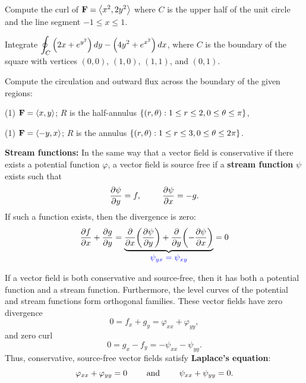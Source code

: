 \documentclass[mathNotesPreamble]{subfiles}
\begin{document}
  \begin{ex*}
    Compute the curl of $\mathbf F={\left\langle x^2,2y^2 \right\rangle}$ where $C$ is the upper half of the unit circle and the line segment $-1\leq x\leq 1$.
  \end{ex*}
  \pagebreak

  \begin{ex*}
    Integrate $\displaystyle \oint_C {\left(2x+e^{y^2}\right)}\,dy-{\left(4y^2+e^{x^2}\right)}\,dx$, where $C$ is the boundary of the square with vertices $(0,0)$, $(1,0)$, $(1,1)$, and $(0,1)$.
  \end{ex*}
  \pagebreak

  \begin{ex*}
    Compute the circulation and outward flux across the boundary of the given regions:
  \end{ex*}
  \begin{tasks}[after-item-skip=\stretch{1}, label=](1)
    \task $\mathbf F={\left\langle x,y \right\rangle}$; $R$ is the half-annulus ${\left\{(r,\theta): 1\leq r\leq 2, 0\leq \theta\leq \pi\right\}}$,
  \end{tasks}
  \pagebreak

  \begin{tasks}[after-item-skip=\stretch{1}, label=, resume](1)
    \task $\mathbf F={\left\langle -y,x \right\rangle}$; $R$ is the annulus ${\left\{(r,\theta): 1\leq r\leq 3, 0\leq \theta\leq 2\pi\right\}}$.
  \end{tasks}
  \pagebreak

  \textbf{Stream functions:}\newline
  In the same way that a vector field is conservative if there exists a potential function $\varphi$, a vector field is source free if a \textbf{stream function} $\psi$ exists such that
    \[\frac{\partial \psi}{\partial y}=f, \hspace*{25pt} \frac{\partial \psi}{\partial x}=-g.\]
  If such a function exists, then the divergence is zero:
    \[\frac{\partial f}{\partial x}+\frac{\partial g}{\partial y}=\underbrace{\frac{\partial}{\partial x}{\left(\frac{\partial \psi}{\partial y}\right)}+\frac{\partial}{\partial y}{\left(-\frac{\partial \psi}{\partial x}\right)}}_{\textcolor{blue}{\displaystyle\psi_{yx}=\psi_{xy}}}=0\]

  If a vector field is both conservative and source-free, then it has both a potential function and a stream function. Furthermore, the level curves of the potential and stream functions form orthogonal families. These vector fields have zero divergence
    \[0=f_x+g_y=\varphi_{xx}+\varphi_{yy},\]
  and zero curl
    \[0=g_x-f_y=-\psi_{xx}-\psi_{yy}.\]
  Thus, conservative, source-free vector fields satisfy \textbf{Laplace's equation}:
    \[\varphi_{xx}+\varphi_{yy}=0 \qquad \textnormal{ and } \qquad \psi_{xx}+\psi_{yy}=0.\]
  \pagebreak
\end{document}
